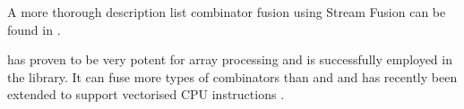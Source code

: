 \documentclass[preamble.tex]{subfiles}
\begin{document}
A more thorough description list combinator fusion using Stream Fusion can be found in \cite{CLS07}.

 has proven to be very potent for array processing and is successfully employed in the  library. It can fuse more types of combinators than  and  and has recently been extended to support vectorised CPU instructions \cite{VectorStreamFusion}.

\end{document}
